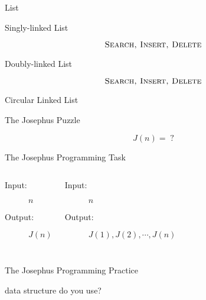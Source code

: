 \begin{frame}{}
  \centerline{\Large List}
\end{frame}

\begin{frame}{Singly-linked List}

  \pause
  \[
    \textsc{Search, Insert, Delete}
  \]
\end{frame}

\begin{frame}{Doubly-linked List}

  \pause
  \[
    \textsc{Search, Insert, Delete}
  \]
\end{frame}

\begin{frame}{Circular Linked List}
\end{frame}

\begin{frame}{The Josephus Puzzle}

  \pause
  \[
    J(n) = \; ?
  \]
\end{frame}

\begin{frame}{The Josephus Programming Task}

  \begin{columns}
      \begin{description}
	\item[Input:] $n$
	\item[Output:] $J(n)$
      \end{description}
      \begin{description}
	\item[Input:] $n$
	\item[Output:] $J(1), J(2), \cdots, J(n)$
      \end{description}
  \end{columns}
\end{frame}

\begin{frame}{The Josephus Programming Practice}
  \centerline{\large {}  data structure do you use?}
  
  \vspace{3pt}
  \centerline{\large {}}

  \pause
  \vspace{0.60cm}
\end{frame}

